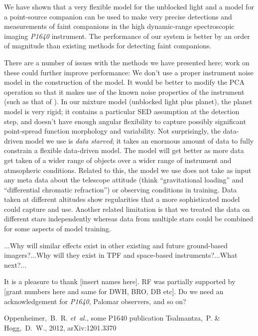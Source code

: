 \documentclass[12pt,pdftex,preprint]{aastex}
\newcommand{\etal}{\textit{et~al.}}
\newcommand{\project}[1]{\textsl{#1}}
\begin{document}
We have shown that a very flexible model for the unblocked light and a
model for a point-source companion can be used to make very precise
detections and measurements of faint companions in the high
dynamic-range spectroscopic imaging \project{P1640} instrument.  The
performance of our system is better by an order of magnitude than
existing methods for detecting faint companions.

There are a number of issues with the methods we have presented here;
work on these could further improve performance: We don't use a proper
instrument noise model in the construction of the model.  It would be
better to modify the PCA operation so that it makes use of the known
noise properties of the instrument (such as that of \citealt{hmf}).
In our mixture model (unblocked light plus planet), the planet model
is very rigid; it contains a particular SED assumption at the
detection step, and doesn't have enough angular flexibility to capture
possibly significant point-spread function morphology and variability.
Not surprisingly, the data-driven model we use is \emph{data starved};
it takes an enormous amount of data to fully constrain a flexible
data-driven model.  The model will get better as more data get taken
of a wider range of objects over a wider range of instrument and
atmsopheric conditions.  Related to this, the model we use does not
take as input any meta data about the telescope attitude (think
``gravitational loading'' and ``differential chromatic refraction'')
or observing conditions in training.  Data taken at different
altitudes show regularities that a more sophisticated model could
capture and use.  Another related limitation is that we treated the
data on different stars independently whereas data from multiple stars
could be combined for some aspects of model training.

...Why will similar effects exist in other existing and future
ground-based imagers?...Why will they exist in TPF and space-based
instruments?...What next?...

\acknowledgements It is a pleasure to thank [insert names here].  RF
was partially supported by [grant numbers here and same for DWH, BRO,
  DB etc].  Do we need an acknowledgement for \project{P1640}, Palomar
observers, and so on?

\begin{thebibliography}{}
\bibitem[Oppenheimer \etal(1875)]{p1640}
Oppenheimer,~B.~R. \etal, some P1640 publication
Tsalmantza,~P. \& Hogg,~D.~W., 2012, arXiv:1201.3370
\end{thebibliography}
\end{document}
